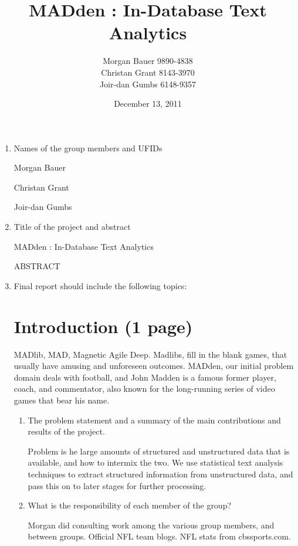 \documentclass{article}
\title{MADden : In-Database Text Analytics}
\author{Morgan Bauer 9890-4838 \\
  Christan Grant 8143-3970 \\
  Joir-dan Gumbs 6148-9357}
\date{December 13, 2011}
\begin{document}
\maketitle
\begin{enumerate}
\item Names of the group members and UFIDs


  Morgan Bauer

  Christan Grant

  Joir-dan Gumbs

\item Title of the project and abstract

  MADden : In-Database Text Analytics

ABSTRACT



\item Final report should include the following topics:

  \section{Introduction (1 page)}

  MADlib, MAD, Magnetic Agile Deep.
  Madlibs, fill in the blank games, that usually have amusing and unforeseen outcomes.
  MADden, our initial problem domain deals with football,
  and John Madden is a famous former player, coach, and commentator,
  also known for the long-running series of video games that bear his name.

  \begin{enumerate}
  \item The problem statement and a summary of the main contributions and results of the project.

    Problem is he large amounts of structured and unstructured data that is available, and how to intermix the two.
    We use statistical text analysis techniques to extract structured information from unstructured data,
    and pass this on to later stages for further processing.

  \item What is the responsibility of each member of the group?



    Morgan did consulting work among the various group members, and between groups.
    Official NFL team blogs. NFL stats from cbssports.com.
  \end{enumerate}


\end{enumerate}
\end{document}
